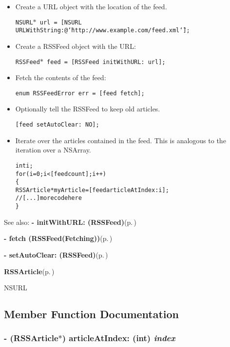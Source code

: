 \begin{itemize}
\item Create a URL object with the location of the feed.\par
 {\tt  NSURL$\ast$ url = [NSURL URLWith\-String:@\char`\"{}http://www.example.com/feed.xml\char`\"{}]; }  \item Create a RSSFeed object with the URL:\par
 {\tt  RSSFeed$\ast$ feed = [RSSFeed init\-With\-URL: url]; }  \item Fetch the contents of the feed:\par
 {\tt  enum RSSFeed\-Error err = [feed fetch]; }  \item Optionally tell the RSSFeed to keep old articles.\par
 {\tt  [feed set\-Auto\-Clear: NO]; }  \item Iterate over the articles contained in the feed. This is analogous to the iteration over a NSArray. \small\begin{alltt}
      int i;
      for (i=0; i<[feed count]; i++)
        \{
          RSSArticle* myArticle = [feed articleAtIndex: i];
          // [...] more code here
        \}
    \end{alltt}\normalsize 
  \end{itemize}


\begin{Desc}
\item[See also:]{\bf - init\-With\-URL: (RSSFeed)}{\rm (p.\,\pageref{interfaceRSSFeed_a1})} 

{\bf - fetch (RSSFeed(Fetching))}{\rm (p.\,\pageref{categoryRSSFeed(Fetching)_a2})} 

{\bf - set\-Auto\-Clear: (RSSFeed)}{\rm (p.\,\pageref{interfaceRSSFeed_a14})}

{\bf RSSArticle}{\rm (p.\,\pageref{interfaceRSSArticle})} 

NSURL\end{Desc}




\subsection{Member Function Documentation}
\subsubsection{\setlength{\rightskip}{0pt plus 5cm}- ({\bf RSSArticle}$\ast$) article\-At\-Index: (int) {\em index}}\label{interfaceRSSFeed_a6}


